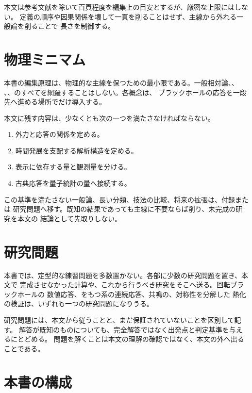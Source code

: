 本文は参考文献を除いて百頁程度を編集上の目安とするが、厳密な上限にはしない。
定義の順序や因果関係を壊して一頁を削ることはせず、主線から外れる一般論を削ることで
長さを制御する。

\section*{物理ミニマム}

本書の編集原理は、物理的な主線を保つための最小限である。一般相対論、、
、、のすべてを網羅することはしない。各概念は、
ブラックホールの応答を一段先へ進める場所でだけ導入する。

本文に残す内容は、少なくとも次の一つを満たさなければならない。

\begin{enumerate}[label=(\roman*),leftmargin=2.8em]
\item 外力と応答の関係を定める。
\item 時間発展を支配する解析構造を定める。
\item 表示に依存する量と観測量を分ける。
\item 古典応答を量子統計の量へ接続する。
\end{enumerate}

この基準を満たさない一般論、長い分類、技法の比較、将来の拡張は、付録または
研究問題へ移す。既知の結果であっても主線に不要ならば削り、未完成の研究を本文の
結論として先取りしない。

\section*{研究問題}

本書では、定型的な練習問題を多数置かない。各部に少数の研究問題を置き、本文で
完成させなかった計算や、これから行うべき研究をそこへ送る。回転ブラックホールの
数値応答、をもつ系の連続応答、共鳴の、対称性を分解した
熱化の検証は、いずれも一つの研究問題になりうる。

研究問題には、本文から従うことと、まだ保証されていないことを区別して記す。
解答が既知のものについても、完全解答ではなく出発点と判定基準を与えるにとどめる。
問題を解くことは本文の理解の確認ではなく、本文の外へ出ることである。

\section*{本書の構成}

